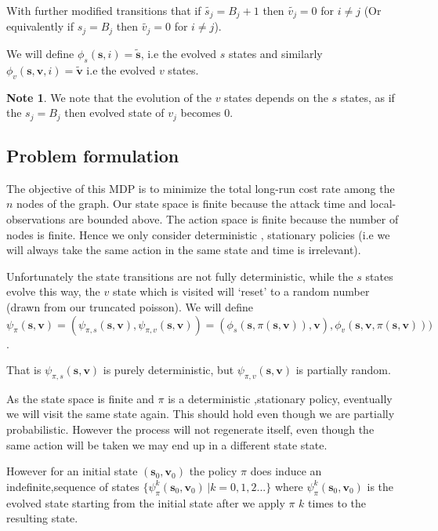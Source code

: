 \documentclass[a4paper,10pt]{article}
\theoremstyle{definition}
\theoremstyle{definition}
\theoremstyle{remark}
\theoremstyle{definition}
\newtheorem*{note}{Note}
\begin{document}
With further modified transitions that if $\widetilde{s_{j}} =B_{j}+1$ then $\widetilde{v_{j}}=0$ for $i \neq j$ (Or equivalently if $s_{j}=B_{j}$ then $\widetilde{v_{j}}=0$ for $i \neq j$).

We will define $\phi_{s}(\bm{s},i)=\widetilde{\bm{s}}$, i.e the evolved $s$ states and similarly $\phi_{v}(\bm{s},\bm{v},i)=\widetilde{\bm{v}}$ i.e the evolved $v$ states.

\begin{note}
We note that the evolution of the $v$ states depends on the $s$ states, as if the $s_{j}=B_{j}$ then evolved state of $v_{j}$ becomes $0$. 
\end{note} 

\subsection{Problem formulation}
The objective of this MDP is to minimize the total long-run cost rate among the $n$ nodes of the graph. Our state space is finite because the attack time and local-observations are bounded above. The action space is finite because the number of nodes is finite. Hence we only consider deterministic , stationary policies (i.e we will always take the same action in the same state and time is irrelevant).

Unfortunately the state transitions are not fully deterministic, while the $s$ states evolve this way, the $v$ state which is visited will `reset' to a random number (drawn from our truncated poisson). We will define $\psi_{\pi}(\bm{s},\bm{v})=(\psi_{\pi,s}(\bm{s},\bm{v}),\psi_{\pi,v}(\bm{s},\bm{v}))=(\phi_{s}(\bm{s},\pi(\bm{s},\bm{v})),\bm{v}),\phi_{v}(\bm{s},\bm{v},\pi(\bm{s},\bm{v})))$.

That is $\psi_{\pi,s}(\bm{s},\bm{v})$ is purely deterministic, but $\psi_{\pi,v}(\bm{s},\bm{v})$ is partially random.

As the state space is finite and $\pi$ is a deterministic ,stationary policy, eventually we will visit the same state again. This should hold even though we are partially probabilistic. However the process will not regenerate itself, even though the same action will be taken we may end up in a different state state.

However for an initial state $(\bm{s}_{0},\bm{v}_{0})$ the policy $\pi$ does induce an indefinite,sequence of states $\{\psi_{\pi}^{k} (\bm{s}_{0},\bm{v}_{0}) \, | k=0,1,2... \}$ where $\psi_{\pi}^{k} (\bm{s}_{0},\bm{v}_{0})$ is the evolved state starting from the initial state after we apply $\pi$ $k$ times to the resulting state.
\end{document}
